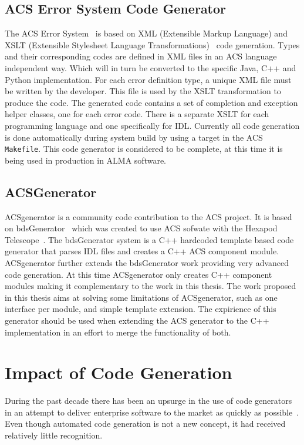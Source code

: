 \subsection{ACS Error System Code Generator}
\label{sec:ACS-error-system}
The ACS Error System~\cite{jeram02:_ACS_error_system}
is based on XML (Extensible Markup Language)
and XSLT (Extensible Stylesheet Language Transformations)~%
 \cite{XSLT-WEB} code generation.
Types and their corresponding codes are defined in XML files
in an ACS language independent way.
Which will in turn be converted to the specific
Java,
C++ and
Python implementation.
For each error definition type,
a unique XML file must be written by the developer.
This file is used by the XSLT transformation to produce the code.
The generated code contains a set of completion and exception helper classes,
one for each error code.
There is a separate XSLT for each programming language
and one specifically for IDL.
Currently all code generation is done automatically
during system build
by using a target in the ACS \lstinline[language=sh]!Makefile!.
This code generator is considered to be complete,
at this time it is being used in production
in ALMA software.

\subsection{ACSGenerator}
\label{sec:acs-generator}
ACSgenerator is a community code contribution to the ACS project.
It is based on bdsGenerator~\cite{ACS-CONT}
which was created to use ACS sofwate
with the Hexapod Telescope~\cite{HPT-WEB}.
The bdsGenerator system is a C++ hardcoded template based code generator
that parses IDL files and creates
a C++ ACS component module.
ACSgenerator further extends the bdsGenerator work
providing very advanced code generation.
At this time ACSgenerator
only creates C++
component modules making it
complementary to the work in this thesis.
The work proposed in this thesis aims
at solving some limitations of ACSgenerator,
such as
one interface per module,
and simple template extension.
The expirience of this generator should be used
when extending the ACS generator to the C++ implementation
in an effort to merge the functionality of both.

\section{Impact of Code Generation}
\label{sec:code-generation:impact}
During the past decade
there has been an
upsurge in the use of code generators
in an attempt to deliver enterprise
software to the market as
quickly as possible~\cite{ACG}.
Even though
automated code generation is not a new concept,
it had received
relatively little recognition.

